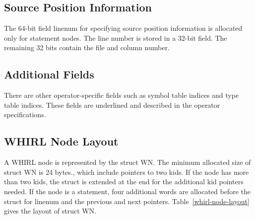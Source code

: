 \subsection{Source Position Information}

The 64-bit field linenum for specifying source position information
is allocated only for statement nodes. The line number is stored
in a 32-bit
field. The remaining 32 bits contain the file and column number.

\subsection{Additional Fields}

There are other operator-specific fields such as symbol table
indices and type table indices. These fields are underlined and
described in the operator specifications.


\subsection{WHIRL Node Layout}

A WHIRL node is represented by the struct WN. The minimum allocated size
of struct WN is 24 bytes., which include pointers to two kids. If the node
has more than two kids, the struct is extended at the end for the
additional kid pointers needed. If the node is a statement, four
additional words are allocated before the struct for linenum and
the previous and next pointers. 
Table~\ref{whirl-node-layout} gives the layout of struct WN.

